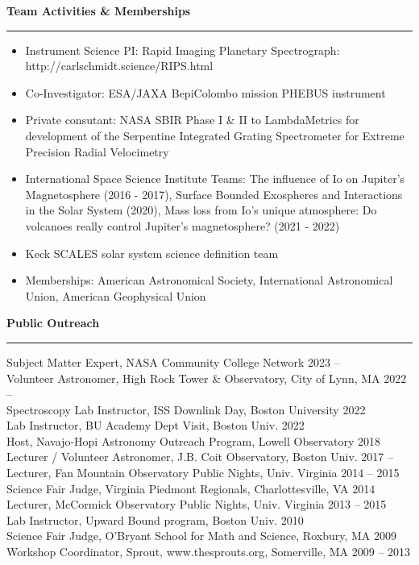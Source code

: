 \documentclass[12pt]{report}
\begin{document}
\noindent\bf{Team Activities \& Memberships}\rm \hspace*{\fill} \\
\rule{\textwidth}{1pt}
\begin{itemize} \itemsep -2pt %
  \item Instrument Science PI: Rapid Imaging Planetary Spectrograph: http://carlschmidt.science/RIPS.html
  \item Co-Investigator: ESA/JAXA BepiColombo mission PHEBUS instrument
  \item Private consutant: NASA SBIR Phase I \& II to LambdaMetrics for development of the Serpentine Integrated Grating Spectrometer for Extreme Precision
Radial Velocimetry
  \item International Space Science Institute Teams: The influence of Io on Jupiter's Magnetosphere (2016 - 2017), Surface Bounded Exospheres and Interactions in the Solar System (2020), Mass loss from Io’s unique atmosphere: Do volcanoes really control Jupiter’s magnetosphere? (2021 - 2022)
  \item Keck SCALES solar system science definition team
  \item Memberships: American Astronomical Society, International Astronomical Union, American Geophysical Union
\end{itemize}
\vspace{2 mm}

\noindent\bf{Public Outreach}\rm \hspace*{\fill} \\
\rule{\textwidth}{1pt}
\noindent Subject Matter Expert, NASA Community College Network \hfill 2023 –     \\
\noindent Volunteer Astronomer, High Rock Tower \& Observatory, City of Lynn, MA \hfill 2022 –     \\
\noindent Spectroscopy Lab Instructor, ISS Downlink Day, Boston University \hfill 2022\\
\noindent Lab Instructor, BU Academy Dept Visit, Boston Univ. \hfill 2022\\
\noindent Host, Navajo-Hopi Astronomy Outreach Program, Lowell Observatory \hfill 2018\\
\noindent Lecturer / Volunteer Astronomer, J.B. Coit Observatory, Boston Univ.	 \hfill 2017 –     \\
\noindent Lecturer, Fan Mountain Observatory Public Nights, Univ. Virginia \hfill 2014 – 2015\\
\noindent Science Fair Judge, Virginia Piedmont Regionals, Charlottesville, VA \hfill 2014\\
\noindent Lecturer, McCormick Observatory Public Nights, Univ. Virginia	 \hfill 2013 – 2015\\
\noindent Lab Instructor, Upward Bound program, Boston Univ. \hfill 2010\\
\noindent Science Fair Judge, O'Bryant School for Math and Science, Roxbury, MA \hfill 2009\\
\noindent Workshop Coordinator, Sprout, www.thesprouts.org, Somerville, MA \hfill 2009 – 2013\\
\end{document}
